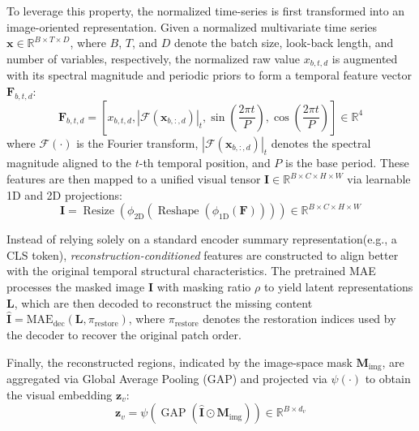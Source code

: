 \documentclass[journal]{IEEEtran}
\begin{document}
To leverage this property, the normalized time-series is first transformed into an image-oriented representation. Given a normalized multivariate time series $\mathbf{x} \in \mathbb{R}^{B \times T \times D}$, where $B$, $T$, and $D$ denote the batch size, look-back length, and number of variables, respectively, the normalized raw value $x_{b,t,d}$ is augmented with its spectral magnitude and periodic priors to form a temporal feature vector $\mathbf{F}_{b,t,d}$:
\begin{equation}
\mathbf{F}_{b,t,d} = \left[ x_{b,t,d}, \left|\mathcal{F}(\mathbf{x}_{b,:,d})\right|_{t}, \sin\left(\frac{2\pi t}{P}\right), \cos\left(\frac{2\pi t}{P}\right) \right] \in \mathbb{R}^{4}
\end{equation}
where $\mathcal{F}(\cdot)$ is the Fourier transform, $\left|\mathcal{F}(\mathbf{x}_{b,:,d})\right|_{t}$ denotes the spectral magnitude aligned to the $t$-th temporal position, and $P$ is the base period. These features are then mapped to a unified visual tensor $\mathbf{I} \in \mathbb{R}^{B \times C \times H \times W}$ via learnable 1D and 2D projections:
\begin{equation}
\mathbf{I} = \operatorname{Resize}\left( \phi_{\text{2D}}\left( \operatorname{Reshape}(\phi_{\text{1D}}(\mathbf{F}))\right) \right)
\in \mathbb{R}^{B \times C \times H \times W}
\end{equation}

Instead of relying solely on a standard encoder summary representation(e.g., a CLS token), \textit{reconstruction-conditioned} features are constructed to align better with the original temporal structural characteristics. The pretrained MAE processes the masked image $\mathbf{I}$ with masking ratio $\rho$ to yield latent representations $\mathbf{L}$, which are then decoded to reconstruct the missing content $\hat{\mathbf{I}} = \text{MAE}_{\text{dec}}(\mathbf{L}, \pi_{\mathrm{restore}})$, where $\pi_{\mathrm{restore}}$ denotes the restoration indices used by the decoder to recover the original patch order.

Finally, the reconstructed regions, indicated by the image-space mask $\mathbf{M}_{\text{img}}$, are aggregated via Global Average Pooling (GAP) and projected via $\psi(\cdot)$ to obtain the visual embedding $\mathbf{z}_v$:
\begin{equation}
\mathbf{z}_v = \psi\left(\operatorname{GAP}\left(\hat{\mathbf{I}} \odot \mathbf{M}_{\text{img}}\right)\right) \in \mathbb{R}^{B \times d_v}
\end{equation}
\end{document}
